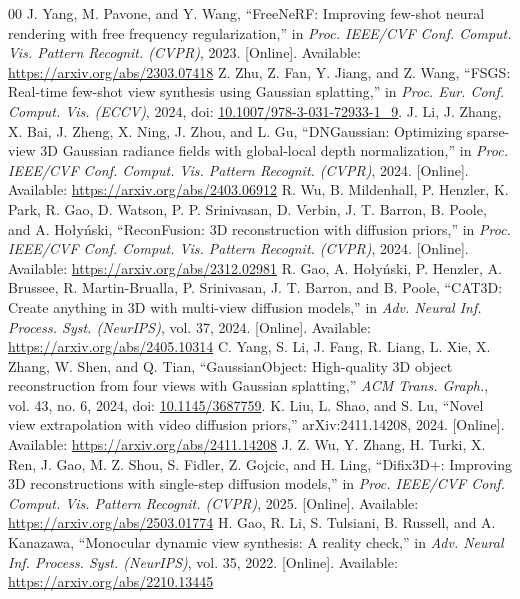 \begin{thebibliography}{00}
 J. Yang, M. Pavone, and Y. Wang, ``FreeNeRF: Improving few-shot neural rendering with free frequency regularization,'' in \textit{Proc. IEEE/CVF Conf. Comput. Vis. Pattern Recognit. (CVPR)}, 2023. [Online]. Available: \url{https://arxiv.org/abs/2303.07418}
 Z. Zhu, Z. Fan, Y. Jiang, and Z. Wang, ``FSGS: Real-time few-shot view synthesis using Gaussian splatting,'' in \textit{Proc. Eur. Conf. Comput. Vis. (ECCV)}, 2024, doi: \href{https://doi.org/10.1007/978-3-031-72933-1_9}{10.1007/978-3-031-72933-1\_9}.
 J. Li, J. Zhang, X. Bai, J. Zheng, X. Ning, J. Zhou, and L. Gu, ``DNGaussian: Optimizing sparse-view 3D Gaussian radiance fields with global-local depth normalization,'' in \textit{Proc. IEEE/CVF Conf. Comput. Vis. Pattern Recognit. (CVPR)}, 2024. [Online]. Available: \url{https://arxiv.org/abs/2403.06912}
 R. Wu, B. Mildenhall, P. Henzler, K. Park, R. Gao, D. Watson, P. P. Srinivasan, D. Verbin, J. T. Barron, B. Poole, and A. Hołyński, ``ReconFusion: 3D reconstruction with diffusion priors,'' in \textit{Proc. IEEE/CVF Conf. Comput. Vis. Pattern Recognit. (CVPR)}, 2024. [Online]. Available: \url{https://arxiv.org/abs/2312.02981}
 R. Gao, A. Hołyński, P. Henzler, A. Brussee, R. Martin-Brualla, P. Srinivasan, J. T. Barron, and B. Poole, ``CAT3D: Create anything in 3D with multi-view diffusion models,'' in \textit{Adv. Neural Inf. Process. Syst. (NeurIPS)}, vol. 37, 2024. [Online]. Available: \url{https://arxiv.org/abs/2405.10314}
 C. Yang, S. Li, J. Fang, R. Liang, L. Xie, X. Zhang, W. Shen, and Q. Tian, ``GaussianObject: High-quality 3D object reconstruction from four views with Gaussian splatting,'' \textit{ACM Trans. Graph.}, vol. 43, no. 6, 2024, doi: \href{https://doi.org/10.1145/3687759}{10.1145/3687759}.
 K. Liu, L. Shao, and S. Lu, ``Novel view extrapolation with video diffusion priors,'' arXiv:2411.14208, 2024. [Online]. Available: \url{https://arxiv.org/abs/2411.14208}
 J. Z. Wu, Y. Zhang, H. Turki, X. Ren, J. Gao, M. Z. Shou, S. Fidler, Z. Gojcic, and H. Ling, ``Difix3D+: Improving 3D reconstructions with single-step diffusion models,'' in \textit{Proc. IEEE/CVF Conf. Comput. Vis. Pattern Recognit. (CVPR)}, 2025. [Online]. Available: \url{https://arxiv.org/abs/2503.01774}
 H. Gao, R. Li, S. Tulsiani, B. Russell, and A. Kanazawa, ``Monocular dynamic view synthesis: A reality check,'' in \textit{Adv. Neural Inf. Process. Syst. (NeurIPS)}, vol. 35, 2022. [Online]. Available: \url{https://arxiv.org/abs/2210.13445}

\end{thebibliography}
